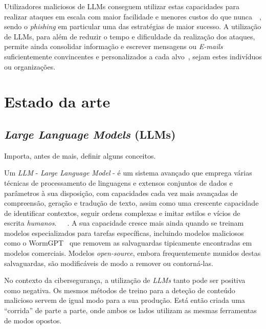 \documentclass[pdflatex,sn-mathphys-num]{sn-jnl}
\theoremstyle{thmstyleone}%
\theoremstyle{thmstyletwo}%
\theoremstyle{thmstylethree}%
\begin{document}
Utilizadores maliciosos de LLMs conseguem utilizar estas capacidades para realizar ataques em escala com maior facilidade e menores custos do que nunca~\cite{bib1}~\cite{bib2}, sendo o \textit{phishing} em particular uma das estratégias de maior sucesso. A utilização de LLMs, para além de reduzir o tempo e dificuldade da realização dos ataques, permite ainda consolidar informação e escrever mensagens ou \textit{E-mails} suficientemente convincentes e personalizados a cada alvo~\cite{bib3}, sejam estes indivíduos ou organizações.




\section{Estado da arte}\label{sec2}
\subsection{\textit{Large Language Models} (LLMs)}\label{subsec2.1}
Importa, antes de mais, definir alguns conceitos.

Um\textit{ LLM} - \textit{Large Language Model} - é um sistema avançado que emprega várias técnicas de processamento de linguagens e extensos conjuntos de dados e parâmetros à sua disposição, com capacidades cada vez mais avançadas de compreensão, geração e tradução de texto, assim como uma crescente capacidade de identificar contextos, seguir ordens complexas e imitar estilos e vícios de escrita \textit{humanos}.~\cite{bib2}~\cite{bib3}~\cite{bib4}.
A sua capacidade cresce mais ainda quando se treinam modelos especializados para tarefas específicas, incluindo modelos maliciosos como o WormGPT~\cite{bib5} que removem as salvaguardas tipicamente encontradas em modelos comerciais. Modelos \textit{open-source}, embora frequentemente munidos destas salvaguardas, são modificáveis de modo a remover ou contorná-las.

No contexto da cibersegurança, a utilização de \textit{LLMs} tanto pode ser positiva como negativa. Os mesmos métodos de treino para a deteção de conteúdo malicioso servem de igual modo para a sua produção. Está então criada uma ``corrida'' de parte a parte, onde ambos os lados utilizam as mesmas ferramentas de modos opostos. 
\end{document}
